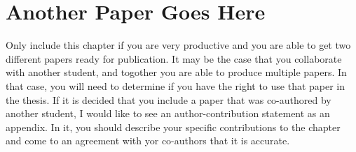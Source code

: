 \chapter{Another Paper Goes Here}
Only include this chapter if you are very productive and you are able to get two different papers ready for publication. It may be the case that you collaborate with another student, and togother you are able to produce multiple papers. In that case, you will need to determine if you have the right to use that paper in the thesis.   If it is decided that you include a paper that was co-authored by another student, I would like to see an author-contribution statement as an appendix. In it, you should describe your specific contributions to the chapter and come to an agreement with yor co-authors that it is accurate.